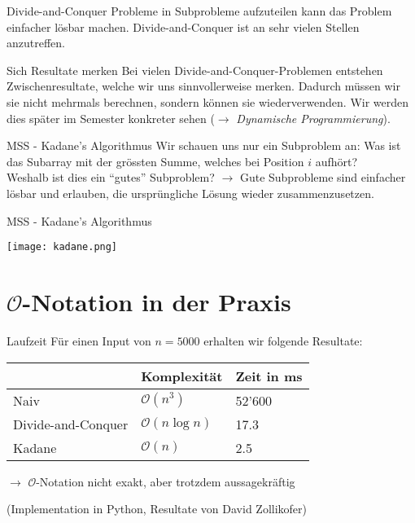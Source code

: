 \documentclass[aspectratio=169]{beamer}
\begin{document}
    \begin{frame}{Divide-and-Conquer}
        Probleme in Subprobleme aufzuteilen kann das Problem einfacher lösbar machen. Divide-and-Conquer ist an sehr vielen Stellen anzutreffen.
    \end{frame}
    \begin{frame}{Sich Resultate merken}
        Bei vielen Divide-and-Conquer-Problemen entstehen Zwischenresultate, welche wir uns sinnvollerweise merken. Dadurch müssen wir sie nicht mehrmals berechnen, sondern können sie wiederverwenden. Wir werden dies später im Semester konkreter sehen (\(\rightarrow\) \textit{Dynamische Programmierung}).
    \end{frame}
    \begin{frame}{MSS - Kadane's Algorithmus}
        Wir schauen uns nur ein Subproblem an: Was ist das Subarray mit der grössten Summe, welches bei Position \(i\) aufhört? \\
        Weshalb ist dies ein ``gutes'' Subproblem? \pause \(\rightarrow\) Gute Subprobleme sind einfacher lösbar und erlauben, die ursprüngliche Lösung wieder zusammenzusetzen.
    \end{frame}
    \begin{frame}{MSS - Kadane's Algorithmus}
        \begin{center}
            \texttt{[image: kadane.png]}
        \end{center}
    \end{frame}
    \section{\texorpdfstring{\(\mathcal{O}\)-Notation in der Praxis}{O-Notation in der Praxis}}
    \begin{frame}{Laufzeit}
        Für einen Input von \(n = 5000\) erhalten wir folgende Resultate:
        \begin{center}
            \begin{tabular}{lll}
                \toprule 
                & Komplexität & Zeit in ms \\
                \midrule
                Naiv & \(\mathcal{O}(n^3)\) & 52'600 \\
                Divide-and-Conquer & \(\mathcal{O}(n \log n)\) & 17.3 \\
                Kadane & \(\mathcal{O}(n)\) & 2.5 \\
                \bottomrule
            \end{tabular}
        \end{center}
        \(\rightarrow\) \(\mathcal{O}\)-Notation nicht exakt, aber trotzdem aussagekräftig\vfill

        (Implementation in Python, Resultate von David Zollikofer)
    \end{frame}
\end{document}
